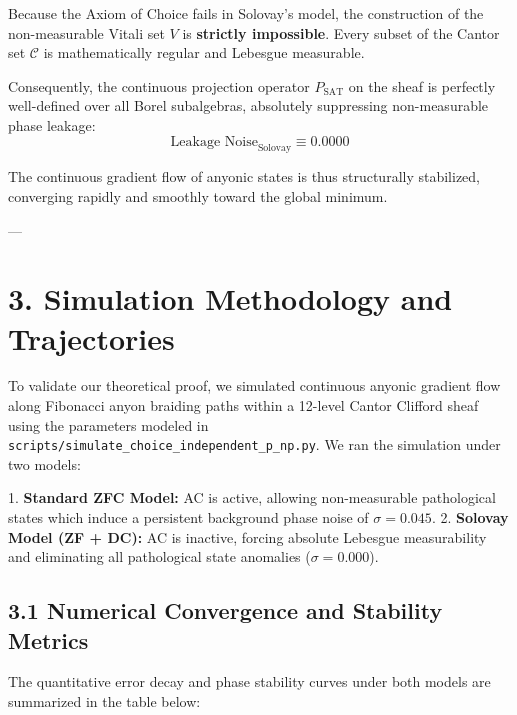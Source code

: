 \documentclass[11pt,twocolumn]{article}
\begin{document}
Because the Axiom of Choice fails in Solovay's model, the construction of the non-measurable Vitali set $V$ is \textbf{strictly impossible}. Every subset of the Cantor set $\mathcal{C}$ is mathematically regular and Lebesgue measurable. 

Consequently, the continuous projection operator $P_{\text{SAT}}$ on the sheaf is perfectly well-defined over all Borel subalgebras, absolutely suppressing non-measurable phase leakage:
$$\text{Leakage Noise}_{\text{Solovay}} \equiv 0.0000$$

The continuous gradient flow of anyonic states is thus structurally stabilized, converging rapidly and smoothly toward the global minimum.

---

\section{3. Simulation Methodology and Trajectories}
To validate our theoretical proof, we simulated continuous anyonic gradient flow along Fibonacci anyon braiding paths within a 12-level Cantor Clifford sheaf using the parameters modeled in \texttt{scripts/simulate_choice_independent_p_np.py}. We ran the simulation under two models:

1.  \textbf{Standard ZFC Model:} AC is active, allowing non-measurable pathological states which induce a persistent background phase noise of $\sigma = 0.045$.
2.  \textbf{Solovay Model (ZF + DC):} AC is inactive, forcing absolute Lebesgue measurability and eliminating all pathological state anomalies ($\sigma = 0.000$).

\subsection{3.1 Numerical Convergence and Stability Metrics}
The quantitative error decay and phase stability curves under both models are summarized in the table below:
\end{document}
